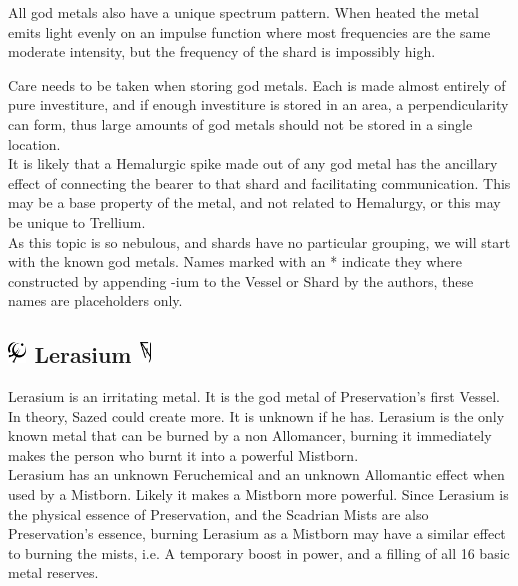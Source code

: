 \documentclass[conference]{IEEEtran}
\begin{document}
All god metals also have a unique spectrum pattern.  When heated the metal emits light evenly on an impulse function where most frequencies are the same moderate intensity, but the frequency of the shard is impossibly high.\cite{TLM-CH13}

Care needs to be taken when storing god metals.  Each is made almost entirely of pure investiture, and if enough investiture is stored in an area, a perpendicularity can form,\cite{TLM-CH59} thus large amounts of god metals should not be stored in a single location.\cite{TLM-CH15}\\

It is likely that a Hemalurgic spike made out of any god metal has the ancillary effect of connecting the bearer to that shard and facilitating communication.\cite{TLM-CH19} This may be a base property of the metal, and not related to Hemalurgy, or this may be unique to Trellium.\\

As this topic is so nebulous, and shards have no particular grouping, we will start with the known god metals.  Names marked with an * indicate they where constructed by appending -ium to the Vessel or Shard by the authors, these names are placeholders only.  
\subsection*{\includegraphics[height=1em]{images/Lerasium.png}  \textbf{Lerasium}\cite{leras} \includegraphics[height=1em]{images/Lerasium_(Feruchemy).png}}
Lerasium is an irritating metal.  It is the god metal of Preservation's first Vessel.\cite{SoS-EP}\cite{leras-leras}\cite{SoS-EP}\cite{leras}  In theory, Sazed could create more.\cite{leras-saz}  It is unknown if he has.  Lerasium is the only known metal that can be burned by a non Allomancer, burning it immediately makes the person who burnt it into a powerful Mistborn.\cite{WoA-CH59}\cite{HoA-CH3}\cite{lerasm-mist}\cite{WoB-Ler}\\

Lerasium has an unknown Feruchemical and an unknown Allomantic effect when used by a Mistborn.  Likely it makes a Mistborn more powerful.  Since Lerasium is the physical essence of Preservation, and the Scadrian Mists are also Preservation's essence,\cite{HoA-CH75} burning Lerasium as a Mistborn may have a similar effect to burning the mists, i.e. A temporary boost in power, and a filling of all 16 basic metal reserves.\cite{HoA-CH73}\\
\end{document}
